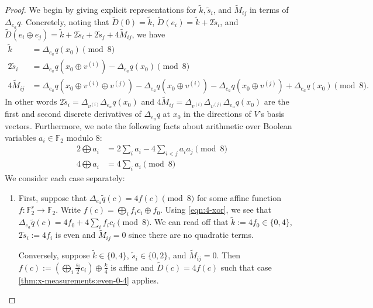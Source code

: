 \begin{proof}
We begin by giving explicit representations for $\tilde k, \tilde s_i$, and  $\tilde M_{ij}$ in terms of $\Delta_{e_a} q$.
Concretely, noting that $\widetilde D(0) = \tilde k$, $\widetilde D(e_i) = \tilde k + 2\tilde s_i$, and $\widetilde D(e_i \oplus e_j) = \tilde k + 2\tilde s_i + 2\tilde s_j + 4\tilde M_{ij}$, we have
\begin{align}
    \tilde k &= \Delta_{e_a}q(x_0) \pmod 8 \label{eqn:k-tilde} \\
    2\tilde s_i &= \Delta_{e_a}q(x_0 \oplus v^{(i)}) - \Delta_{e_a}q(x_0) \pmod 8 \label{eqn:s-tilde} \\
    4\tilde M_{ij} &= \Delta_{e_a}q(x_0 \oplus v^{(i)} \oplus v^{(j)}) - \Delta_{e_a}q(x_0 \oplus v^{(i)}) - \Delta_{e_a}q(x_0 \oplus v^{(j)}) + \Delta_{e_a}q(x_0) \pmod 8 \label{eqn:M-tilde}.
\end{align}
In other words $2\tilde s_i = \Delta_{v^{(i)}}\Delta_{e_a}q(x_0)$ and $4\tilde M_{ij} = \Delta_{v^{(i)}}\Delta_{v^{(j)}}\Delta_{e_a}q(x_0)$ are the first and second discrete derivatives of $\Delta_{e_a}q$ at $x_0$ in the directions of $V$'s basis vectors.
Furthermore, we note the following facts about arithmetic over Boolean variables $a_i \in \mathbb F_2$ modulo 8:
\begin{align}
    2\bigoplus a_i &= 2\sum_i a_i - 4\sum_{i<j} a_ia_j \pmod 8 \label{eqn:2-xor} \\
    4\bigoplus a_i &= 4\sum_{i} a_i \pmod 8 \label{eqn:4-xor}
\end{align}
We consider each case separately:
\begin{enumerate}
\item
First, suppose that $\Delta_{e_a}\tilde q(c) = 4f(c) \pmod 8$ for some affine function $f: \mathbb F_2^r \to \mathbb F_2$. Write $f(c) = \bigoplus_i f_ic_i \oplus f_0$.
Using \cref{eqn:4-xor}, we see that $\Delta_{e_a}\tilde q(c) = 4f_0 + 4\sum_i f_ic_i \pmod 8$.
We can read off that $\tilde k := 4f_0 \in \{0, 4\}$, $2\tilde s_i := 4f_i$ is even and $\tilde M_{ij} = 0$ since there are no quadratic terms.

Conversely, suppose $\tilde k \in \{0,4\}$, $\tilde s_i \in \{0,2\}$, and $\tilde M_{ij} = 0$.
Then $f(c) := \left(\bigoplus_i \frac{s_i}{2}c_i\right) \oplus \frac{k}{4}$ is affine and $\widetilde D(c) = 4f(c)$ such that case \ref{thm:x-measurements:even-0-4} applies.


\end{enumerate}
\end{proof}
